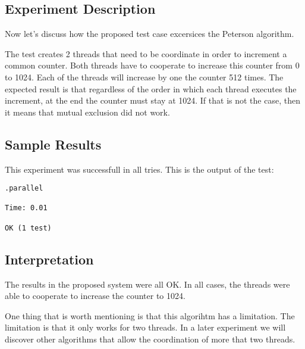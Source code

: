 \subsection{Experiment Description}
\par
 Now let's discuss how the proposed test case excersices the Peterson algorithm. 
 \par
 The test creates 2 threads that need to be coordinate in order to increment a
common counter. Both threads have to cooperate to increase this counter from 0
to 1024. Each of the threads will increase by one the counter 512 times. The
expected result is that regardless of the order in which each thread executes
the increment, at the end the counter must stay at 1024. If that is not the
case, then it means that mutual exclusion did not work.
\par
\subsection{Sample Results}
\par
This experiment was successfull in all tries. This is the output of the test:
\par
\begin{verbatim}
.parallel

Time: 0.01

OK (1 test)
\end{verbatim}
\hfill
\subsection{Interpretation}
\par
The results in the proposed system were all OK. In all cases, the threads were
able to cooperate to increase the counter to 1024.
\par
One thing that is worth mentioning is that this algorihtm has a limitation. The
limitation is that it only works for two threads. In a later experiment we will
discover other algorithms that allow the coordination of more that two threads.
